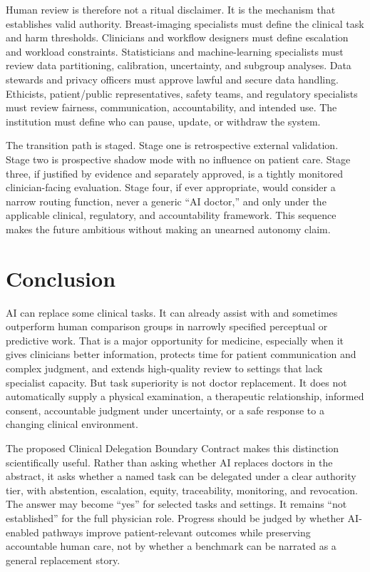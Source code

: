 \documentclass[conference]{IEEEtran}
\begin{document}
Human review is therefore not a ritual disclaimer. It is the mechanism that establishes valid authority. Breast-imaging specialists must define the clinical task and harm thresholds. Clinicians and workflow designers must define escalation and workload constraints. Statisticians and machine-learning specialists must review data partitioning, calibration, uncertainty, and subgroup analyses. Data stewards and privacy officers must approve lawful and secure data handling. Ethicists, patient/public representatives, safety teams, and regulatory specialists must review fairness, communication, accountability, and intended use. The institution must define who can pause, update, or withdraw the system.

The transition path is staged. Stage one is retrospective external validation. Stage two is prospective shadow mode with no influence on patient care. Stage three, if justified by evidence and separately approved, is a tightly monitored clinician-facing evaluation. Stage four, if ever appropriate, would consider a narrow routing function, never a generic “AI doctor,” and only under the applicable clinical, regulatory, and accountability framework. This sequence makes the future ambitious without making an unearned autonomy claim.

\section{Conclusion}

AI can replace some clinical tasks. It can already assist with and sometimes outperform human comparison groups in narrowly specified perceptual or predictive work. That is a major opportunity for medicine, especially when it gives clinicians better information, protects time for patient communication and complex judgment, and extends high-quality review to settings that lack specialist capacity. But task superiority is not doctor replacement. It does not automatically supply a physical examination, a therapeutic relationship, informed consent, accountable judgment under uncertainty, or a safe response to a changing clinical environment.

The proposed Clinical Delegation Boundary Contract makes this distinction scientifically useful. Rather than asking whether AI replaces doctors in the abstract, it asks whether a named task can be delegated under a clear authority tier, with abstention, escalation, equity, traceability, monitoring, and revocation. The answer may become ``yes'' for selected tasks and settings. It remains ``not established'' for the full physician role. Progress should be judged by whether AI-enabled pathways improve patient-relevant outcomes while preserving accountable human care, not by whether a benchmark can be narrated as a general replacement story.
\end{document}
